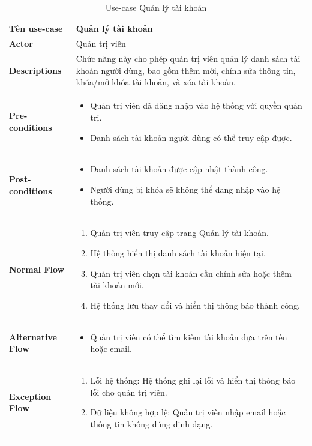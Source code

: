 \begin{longtable}[H]{|l|p{}|}
    \caption{Use-case Quản lý tài khoản} \\
    \hline
    \textbf{Tên use-case} & Quản lý tài khoản \\
    \hline
    \textbf{Actor} & Quản trị viên \\
    \hline
    \textbf{Descriptions} & Chức năng này cho phép quản trị viên quản lý danh sách tài khoản người dùng, bao gồm thêm mới, chỉnh sửa thông tin, khóa/mở khóa tài khoản, và xóa tài khoản. \\
    \hline
    \textbf{Pre-conditions} & 
    \begin{itemize}[leftmargin=4mm]
        \item Quản trị viên đã đăng nhập vào hệ thống với quyền quản trị.
        \item Danh sách tài khoản người dùng có thể truy cập được.
    \end{itemize} \\
    \hline
    \textbf{Post-conditions} & 
    \begin{itemize}[leftmargin=4mm]
        \item Danh sách tài khoản được cập nhật thành công.
        \item Người dùng bị khóa sẽ không thể đăng nhập vào hệ thống.
    \end{itemize} \\
    \hline
    \textbf{Normal Flow} &  
    \begin{enumerate}[leftmargin=5.5mm]
        \item Quản trị viên truy cập trang Quản lý tài khoản.
        \item Hệ thống hiển thị danh sách tài khoản hiện tại.
        \item Quản trị viên chọn tài khoản cần chỉnh sửa hoặc thêm tài khoản mới.
        \item Hệ thống lưu thay đổi và hiển thị thông báo thành công.
    \end{enumerate} \\
    \hline
    \textbf{Alternative Flow} & 
    \begin{itemize}[leftmargin=4mm]
        \item Quản trị viên có thể tìm kiếm tài khoản dựa trên tên hoặc email.
    \end{itemize} \\
    \hline
    \textbf{Exception Flow} & 
    \begin{enumerate}[leftmargin=5.5mm]
        \item Lỗi hệ thống: Hệ thống ghi lại lỗi và hiển thị thông báo lỗi cho quản trị viên.
        \item Dữ liệu không hợp lệ: Quản trị viên nhập email hoặc thông tin không đúng định dạng.
    \end{enumerate} \\
    \hline
\end{longtable}

